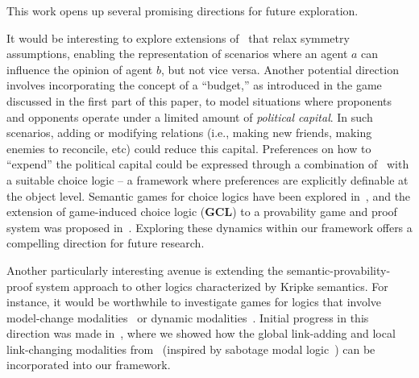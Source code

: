 
This work opens up several promising directions for future exploration.

It would be interesting to explore extensions of \PNL\ that relax symmetry assumptions, enabling the representation of scenarios where an agent $a$ can influence the opinion of agent $b$, but not vice versa. Another potential direction involves incorporating the concept of a ``budget,'' as introduced in the game discussed in the first part of this paper, to model situations where proponents and opponents operate under a limited amount of \emph{political capital}. In such scenarios, adding or modifying relations (i.e., making new friends, making enemies to reconcile, etc) could reduce this capital.
Preferences on how to ``expend'' the political capital could be expressed through a combination of \PNL\ with a suitable choice logic -- a framework where preferences are explicitly definable at the object level. Semantic games for choice logics have been explored in~\cite{Freiman2023TruthLogic}, and the extension of game-induced choice logic (\textbf{GCL}) to a provability game and proof system was proposed in~\cite{Freiman2023}. 
Exploring these dynamics within our framework
offers a compelling direction for future research.


Another particularly interesting avenue is extending the semantic-provability-proof system approach to other logics characterized by Kripke semantics. For instance, it would be worthwhile to investigate games for logics that involve model-change modalities~\cite{DBLP:journals/logcom/Velazquez-Quesada17,DBLP:journals/igpl/PerrotinV21} or dynamic modalities~\cite{DBLP:journals/synthese/BenthemGL08}. Initial progress in this direction was made in~\cite{LPAR2024:Reasoning_About_Group_Polarization}, where we showed how the global link-adding and local link-changing modalities from~\cite{DBLP:journals/logcom/PedersenSA21} (inspired by sabotage modal logic~\cite{DBLP:journals/igpl/ArecesFH15,DBLP:journals/logcom/AucherBG18,DBLP:journals/logcom/BenthemLSY23}) can be incorporated into our framework.


